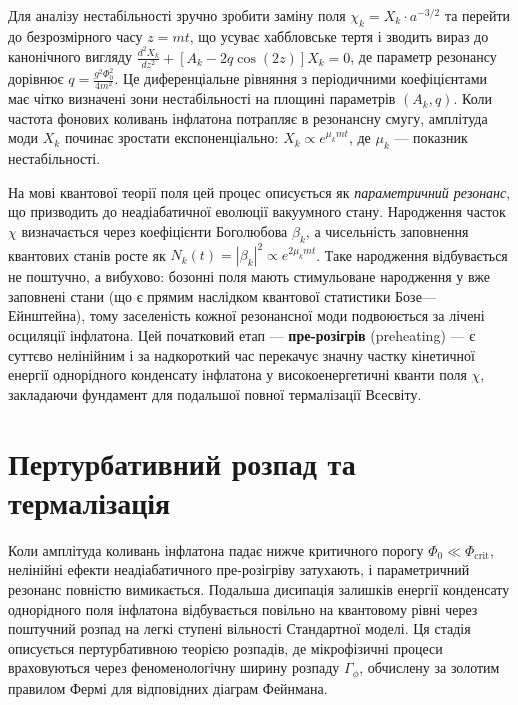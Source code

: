 Для аналізу нестабільності зручно зробити заміну поля $\chi_k = X_k \cdot a^{-3/2}$ та перейти до безрозмірного часу $z = mt$, що усуває хаббловське тертя і зводить вираз до канонічного вигляду $\frac{d^2 X_k}{dz^2} + [A_k - 2q\cos(2z)]X_k = 0$, де параметр резонансу дорівнює $q = \frac{g^2\Phi_0^2}{4m^2}$. Це диференціальне рівняння з періодичними коефіцієнтами має чітко визначені зони нестабільності на площині параметрів $(A_k, q)$. Коли частота фонових коливань інфлатона потрапляє в резонансну смугу, амплітуда моди $X_k$ починає зростати експоненціально: $X_k \propto e^{\mu_k mt}$, де $\mu_k$ --- показник нестабільності.

На мові квантової теорії поля цей процес описується як \emph{параметричний резонанс}, що призводить до неадіабатичної еволюції вакуумного стану. Народження часток $\chi$ визначається через коефіцієнти Боголюбова $\beta_k$, а чисельність заповнення квантових станів росте як $N_k(t) = |\beta_k|^2 \propto e^{2\mu_k mt}$. Таке народження відбувається не поштучно, а вибухово: бозонні поля мають стимульоване народження у вже заповнені стани (що є прямим наслідком квантової статистики Бозе---Ейнштейна), тому заселеність кожної резонансної моди подвоюється за лічені осциляції інфлатона. Цей початковий етап --- \textbf{пре-розігрів} (preheating) --- є суттєво нелінійним і за надкороткий час перекачує значну частку кінетичної енергії однорідного конденсату інфлатона у високоенергетичні кванти поля $\chi$, закладаючи фундамент для подальшої повної термалізації Всесвіту.

\section{Пертурбативний розпад та термалізація}

Коли амплітуда коливань інфлатона падає нижче критичного порогу $\Phi_0 \ll \Phi_{\mathrm{crit}}$, нелінійні ефекти неадіабатичного пре-розігріву затухають, і параметричний резонанс повністю вимикається. Подальша дисипація залишків енергії конденсату однорідного поля інфлатона відбувається повільно на квантовому рівні через поштучний розпад на легкі ступені вільності Стандартної моделі. Ця стадія описується пертурбативною теорією розпадів, де мікрофізичні процеси враховуються через феноменологічну ширину розпаду $\Gamma_\phi$, обчислену за золотим правилом Фермі для відповідних діаграм Фейнмана.

